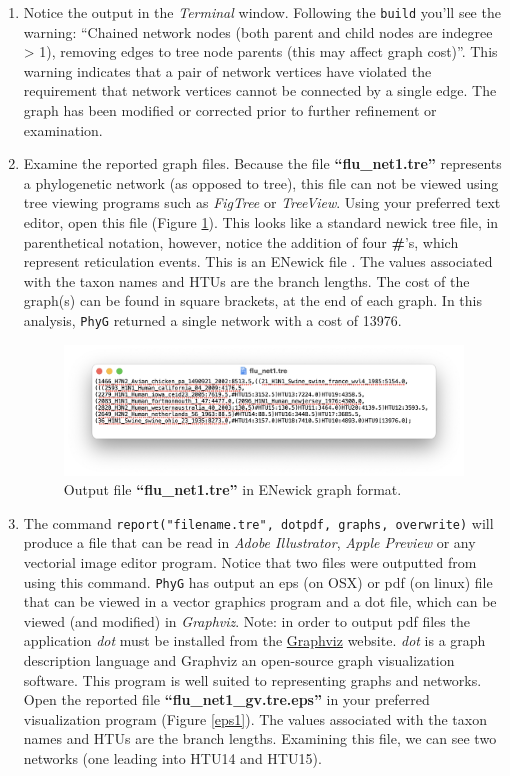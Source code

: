 \documentclass[11pt]{article}
\newcommand{\phyg}{\texttt{PhyG} }
\begin{document}
\begin{enumerate}
\item Notice the output in the \textit{Terminal} window. Following the \texttt{build}
you'll see the warning: ``Chained network nodes (both parent and child nodes are 
indegree > 1), removing edges to tree node parents (this may affect graph cost)''.
This warning indicates that a pair of network vertices have violated the requirement 
\citep{Moretetal2004} that network vertices cannot be connected by a single edge. 
The graph has been modified or corrected prior to further refinement or examination.

\item Examine the reported graph files. Because the file \textbf{``flu\_net1.tre''} 
represents a phylogenetic network (as opposed to tree), this file can not be viewed 
using tree viewing programs such as \textit{FigTree} or \textit{TreeView}. Using 
your preferred text editor, open this file (Figure \ref{tre1}). This looks like a standard 
newick tree file, in parenthetical notation, however, notice the addition of four 
\textbf{\#}'s, which represent reticulation events. This is an ENewick file 
\citep{Cardonaetal2008}. The values associated with the taxon names and HTUs 
are the branch lengths. The cost of the graph(s) can be found in square brackets, 
at the end of each graph. In this analysis, \phyg returned a single network  with a 
cost of 13976.
 
\begin{figure}[H]
\centering
\includegraphics[width=\textwidth]{tre1.png}
\caption{Output file \textbf{``flu\_net1.tre''} in ENewick graph format.}
\label{tre1}
\end{figure}

\item  The command \texttt{report("filename.tre", dotpdf, graphs, overwrite)} will 
produce a file that can be read in \textit{Adobe Illustrator}, \textit{Apple Preview} 
or any vectorial image editor program. Notice that two files were outputted from 
using this command. \phyg has output an eps (on OSX) or pdf (on linux) file that 
can be viewed in a vector graphics program and a dot file, which can be viewed 
(and modified) in \textit{Graphviz}. Note: in order to output pdf files the application 
\textit{dot} must be installed from the \href{https://graphviz.org/download/}{Graphviz} 
website. \textit{dot} is a graph description language and Graphviz an open-source 
graph visualization software. This program is well suited to representing graphs 
and networks. Open the reported file \textbf{``flu\_net1\_gv.tre.eps''} in your preferred
visualization program (Figure \ref{eps1}). The values associated with the taxon 
names and HTUs are the branch lengths. Examining this file, we can see two
networks (one leading into HTU14 and HTU15).


\end{enumerate}
\end{document}
